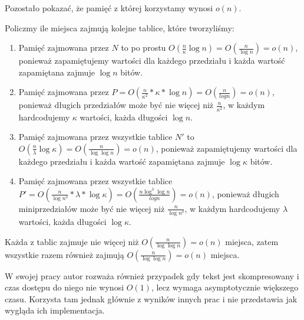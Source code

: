 \documentclass{article}
\begin{document}
Pozostało pokazać, że pamięć z której korzystamy wynosi $o(n)$.

Policzmy ile miejsca zajmują kolejne tablice, które tworzyliśmy:
\begin{enumerate}
    \item Pamięć zajmowana przez $N$ to po prostu $O(\frac{n}{\kappa}\log{n}) = O(\frac{n}{\log{n}}) = o(n)$, ponieważ zapamiętujemy wartości dla każdego przedziału i każda wartość zapamiętana zajmuje $\log{n}$ bitów.
    \item Pamięć zajmowana przez $P = O(\frac{n}{\kappa^2}*\kappa * \log{n}) = O(\frac{n}{log{n}}) = o(n)$, ponieważ długich przedziałów może być nie więcej niż $\frac{n}{\kappa^2}$, w każdym hardcodujemy $\kappa$ wartości, każda długości $\log{n}$.
    \item Pamięć zajmowana przez wszystkie tablice $N'$ to $O(\frac{n}{\lambda}\log{\kappa}) = O(\frac{n}{\log{\log{n}}}) = o(n)$, ponieważ zapamiętujemy wartości dla każdego przedziału i każda wartość zapamiętana zajmuje $\log{\kappa}$ bitów.
    \item Pamięć zajmowana przez wszystkie tablice $P' = O(\frac{n}{\log{n}^{\delta}}*\lambda * \log{\kappa}) = O(\frac{n \log^3{\log{n}}}{log{n}}) = o(n)$, ponieważ długich miniprzedziałów może być nie więcej niż $\frac{n}{\log{n}^{\delta}}$, w każdym hardcodujemy $\lambda$ wartości, każda długości $\log{\kappa}$.
\end{enumerate}

Każda z tablic zajmuje nie więcej niż $O(\frac{n}{\log{\log{n}}}) = o(n)$ miejsca, zatem wszystkie razem również zajmują $O(\frac{n}{\log{\log{n}}}) = o(n)$ miejsca.

W swojej pracy autor rozważa również przypadek gdy tekst jest skompresowany i czas dostępu do niego nie wynosi $O(1)$, lecz wymaga asymptotycznie większego czasu. Korzysta tam jednak głównie z wyników innych prac i nie przedstawia jak wygląda ich implementacja.
\end{document}
